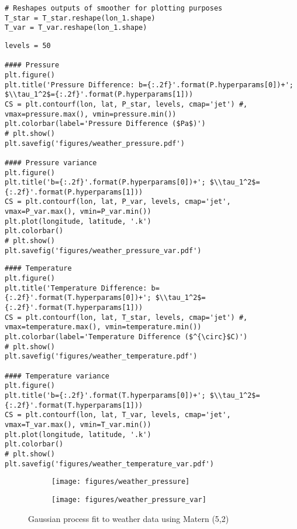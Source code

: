 \documentclass[10pt]{article}
\begin{document}
\begin{enumerate}[label=(\Alph*)]
\begin{lstlisting}
# Reshapes outputs of smoother for plotting purposes
T_star = T_star.reshape(lon_1.shape)
T_var = T_var.reshape(lon_1.shape)
        \end{lstlisting}

        \begin{lstlisting}
levels = 50

#### Pressure
plt.figure()
plt.title('Pressure Difference: b={:.2f}'.format(P.hyperparams[0])+'; $\\tau_1^2$={:.2f}'.format(P.hyperparams[1]))
CS = plt.contourf(lon, lat, P_star, levels, cmap='jet') #, vmax=pressure.max(), vmin=pressure.min())
plt.colorbar(label='Pressure Difference ($Pa$)')
# plt.show()
plt.savefig('figures/weather_pressure.pdf')

#### Pressure variance
plt.figure()
plt.title('b={:.2f}'.format(P.hyperparams[0])+'; $\\tau_1^2$={:.2f}'.format(P.hyperparams[1]))
CS = plt.contourf(lon, lat, P_var, levels, cmap='jet', vmax=P_var.max(), vmin=P_var.min())
plt.plot(longitude, latitude, '.k')
plt.colorbar()
# plt.show()
plt.savefig('figures/weather_pressure_var.pdf')
        \end{lstlisting}

        \begin{lstlisting}
#### Temperature
plt.figure()
plt.title('Temperature Difference: b={:.2f}'.format(T.hyperparams[0])+'; $\\tau_1^2$={:.2f}'.format(T.hyperparams[1]))
CS = plt.contourf(lon, lat, T_star, levels, cmap='jet') #, vmax=temperature.max(), vmin=temperature.min())
plt.colorbar(label='Temperature Difference ($^{\circ}$C)')
# plt.show()
plt.savefig('figures/weather_temperature.pdf')

#### Temperature variance
plt.figure()
plt.title('b={:.2f}'.format(T.hyperparams[0])+'; $\\tau_1^2$={:.2f}'.format(T.hyperparams[1]))
CS = plt.contourf(lon, lat, T_var, levels, cmap='jet', vmax=T_var.max(), vmin=T_var.min())
plt.plot(longitude, latitude, '.k')
plt.colorbar()
# plt.show()
plt.savefig('figures/weather_temperature_var.pdf')
        \end{lstlisting}

            \begin{figure}
                \begin{subfigure}{.5\textwidth}
                  \centering
                  \texttt{[image: figures/weather\_pressure]}
                \end{subfigure}%
                \begin{subfigure}{.5\textwidth}
                  \centering
                  \texttt{[image: figures/weather\_pressure\_var]}
                \end{subfigure}
            \caption{Gaussian process fit to weather data using Matern (5,2)}
            \label{fig:weather_pressure}
            \end{figure}


\end{enumerate}
\end{document}
